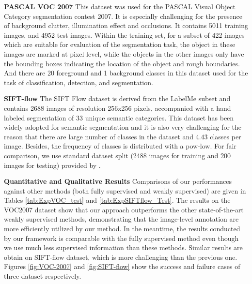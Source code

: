 \textbf{PASCAL VOC 2007}
This dataset was used for the PASCAL Visual Object Category segmentation contest 2007. It is especially challenging for the presence of background clutter, illumination effect and occlusions. It contains 5011 training images, and 4952 test images. Within the training set, for a subset of 422 images which are suitable for evaluation of the segmentation task, the object in these images are marked at pixel level, while the objects in the other images only have the bounding boxes indicating the location of the object and rough boundaries. And there are 20 foreground and 1 background classes in this dataset used for the task of classification, detection, and segmentation.


\textbf{SIFT-flow} The SIFT Flow dataset\cite{liu2011nonparametric} is derived from the LabelMe subset and contains 2688 images of resolution 256x256 pixels, accompanied with a hand labeled segmentation of 33 unique semantic categories. This dataset has been widely adopted for semantic segmentation and it is also very challenging for the reason that there are large number of classes in the dataset and $4.43$ classes per image. Besides, the frequency of classes is distributed with a pow-low. For fair comparison, we use standard dataset split (2488 images for training and 200 images for testing) provided by \cite{liu2011nonparametric}.

\textbf{Quantitative and Qualitative Results} Comparisons of our performances against other methods (both fully supervised and weakly supervised) are given in Tables \ref{tab:ExpVOC_test} and \ref{tab:ExpSIFTflow_Test}. The results on the VOC2007 dataset show that our approach outperforms the other state-of-the-art weakly supervised methods, demonstrating that the image-level annotation are more efficiently utilized by our method. In the meantime, the results conducted by our framework is comparable with the fully supervised method even though we use much less supervised information than these methods. Similar results are obtain on SIFT-flow dataset, which is more challenging than the previous one. Figures \ref{fig:VOC-2007} and \ref{fig:SIFT-flow} show the success and failure cases of three dataset respectively.

